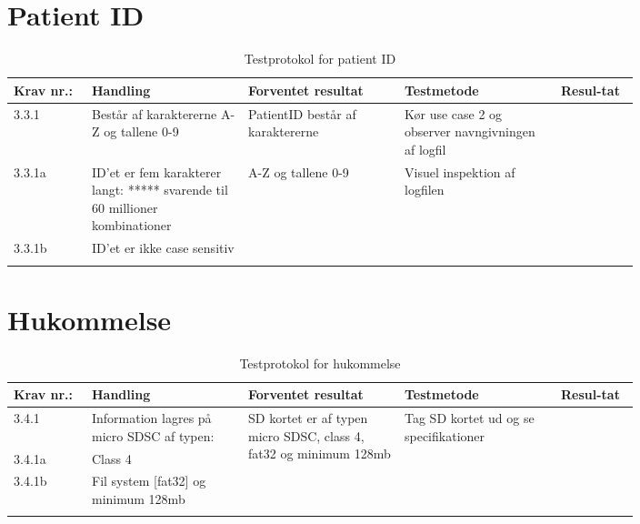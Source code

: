 			\section{Patient ID}
				\begin{longtable}{|p{0.1\linewidth}|p{0.2\linewidth}|p{0.2\linewidth}|p{0.2\linewidth}|p{0.1\linewidth}|}
					\hline
					\rowcolor{usDef}
					Krav nr.: & Handling & Forventet resultat & Testmetode & Resul-tat  \\\hline
					3.3.1 & 
					Består af karaktererne A-Z og tallene 0-9 & PatientID består af karaktererne  & Kør use case 2  og observer navngivningen af logfil & \\ \hline
					3.3.1a& ID’et er fem karakterer langt: ***** svarende til 60 millioner kombinationer & \multirow{2}{0.2\textwidth}{A-Z og tallene 0-9} & \multirow{2}{0.2\textwidth}{Visuel inspektion af logfilen}  & \multirow{2}{0.2\textwidth}{} \\ \cline{1-2}
					3.3.1b& ID’et er ikke case sensitiv  & &  & \\ \hline
					\caption{Testprotokol for patient ID}
				\end{longtable}
			
			\section{Hukommelse}
				\begin{longtable}{|p{0.1\linewidth}|p{0.2\linewidth}|p{0.2\linewidth}|p{0.2\linewidth}|p{0.1\linewidth}|}
					\hline
					\rowcolor{usDef}
					Krav nr.: & Handling & Forventet resultat & Testmetode & Resul-tat  \\\hline
					3.4.1& Information lagres på micro SDSC af typen: & \multirow{3}{\linewidth}{SD kortet er af typen micro SDSC, class 4, fat32 og minimum 128mb} & \multirow{3}{\linewidth}{Tag SD kortet ud og se specifikationer}  & \multirow{3}{\linewidth}{}  \\ \cline{1-2}
					3.4.1a& Class 4 & &  & \\ \cline{1-2}
					3.4.1b& Fil system [fat32] og minimum 128mb  & &  & \\ \hline
					\caption{Testprotokol for hukommelse}
				\end{longtable}
			
			\newpage
